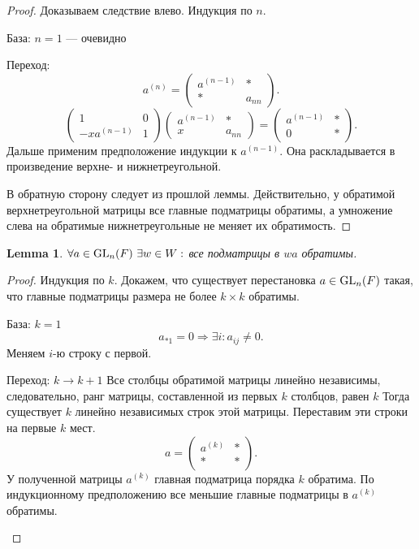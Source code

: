 \documentclass[11pt]{book}
\newcommand{\GL}{{\mathop{\text{\rm GL}}}}
\theoremstyle{definition}
\theoremstyle{plain}
\theoremstyle{plain}
\newtheorem{lm}{Lemma}
\theoremstyle{definition}
\theoremstyle{remark}
\begin{document}
\begin{proof}
    Доказываем следствие влево.
    Индукция по $n$.
    \begin{description}
	\item База: $n=1$ --- очевидно\\
	\item Переход: \\
	    \[
		a^{(n)} =
		\left (
		    \begin{array}{cc}
			a^{(n-1)} & * \\
			* & a_{nn}
		    \end{array}
		\right )
	    .\]
	    \[
		\left (
		    \begin{array}{cc}
			1&0\\-xa^{(n-1)}&1
		    \end{array}
		\right )
		\left (
		    \begin{array}{cc}
			a^{(n-1)} & *\\
			x&a_{nn}
		    \end{array}
		\right )=
		\left (
		    \begin{array}{cc}
			a^{(n-1)}&*\\0&*
		    \end{array}
		\right )
	    .\]
	    Дальше применим предположение индукции к $a^{(n-1)}$. Она раскладывается в произведение верхне- и нижнетреугольной.
    \end{description}
    В обратную сторону следует из прошлой леммы.
    Действительно, у обратимой верхнетреугольной матрицы все главные подматрицы обратимы, а умножение слева на обратимые	нижнетреугольные не меняет их обратимость.
\end{proof}
\begin{lm}
    $\forall a \in  \GL_n(F) ~ \exists w \in  W : $ все подматрицы в $wa$ обратимы.
\end{lm}
\begin{proof}
    Индукция по $k$.
    Докажем, что существует перестановка $a \in  \GL_n(F)$ такая, что главные подматрицы размера не более $k \times k$ обратимы.
    \begin{description}
	\item База: $k=1$ \[
		a_{*1} = 0 \Rightarrow \exists i: a_{ij} \ne 0
	    .\] Меняем $i$-ю строку с первой.
	\item Переход: $ k \to  k+1$
	    Все столбцы обратимой матрицы линейно независимы, следовательно, ранг матрицы, составленной из первых $ k$ столбцов, равен  $ k$
	    Тогда существует $ k$ линейно независимых строк  этой матрицы.
	    Переставим эти строки на первые $ k$ мест.
	    \[
		a =
		\left (
		    \begin{array}{cc}
			a^{(k)}& *\\
			* & *
		    \end{array}
		\right )
	    .\]
	    У полученной матрицы $ a^{(k)}$ главная подматрица порядка $ k$ обратима.
	    По индукционному предположению все меньшие главные подматрицы в $a^{(k)}$ обратимы.
    \end{description}
\end{proof}
\end{document}
